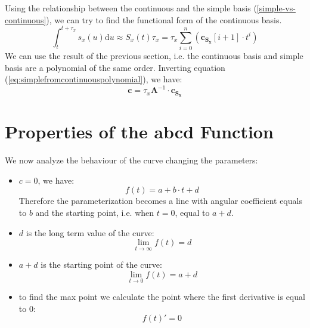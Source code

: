 \documentclass{article}
\begin{document}
\begin{appendices}
Using the relationship between the continuous and the simple basis (\ref{simple-vs-continuous}), we can try to find the functional form of the continuous basis.
\begin{equation}
\int_t^{t+\tau_x} s_x(u) \mathrm{d}u \approx S_x(t) \tau_x= \tau_x \sum_{i=0}^{n}(\mathbf{c_{S_x}}[i+1] \cdot t^i) 
\end{equation}
We can use the result of the previous section, i.e. the continuous basis and simple basis are a polynomial of the same order. Inverting equation (\ref{eq:simplefromcontinuouspolynomial}), we have:
\begin{equation}
\mathbf{c} = \tau_x \mathbf{A}^{-1} \cdot \mathbf{c_{S_x}}
\end{equation}

\section{Properties of the abcd Function}



We now analyze the behaviour of the curve changing the parameters:

\begin{itemize}
\item \textbf{$c=0$}, we have:
\begin{equation}
f(t) = a + b\cdot t + d
\end{equation}
Therefore the parameterization becomes a line with angular coefficient equals to $b$ and the starting point, i.e. when $t=0$, equal to $a+d$.

\item $d$ is the long term value of the curve:
\begin{equation}
\lim_{t\rightarrow \infty} f(t)=d
\end{equation}

\item $a+d$ is the starting point of the curve:
\begin{equation}
\lim_{t\rightarrow 0} f(t)=a+d
\end{equation}

\item to find the max point we calculate the point where the first derivative is equal to $0$:
\begin{equation}
f(t)' = 0
\end{equation}


\end{itemize}
\end{appendices}
\end{document}
